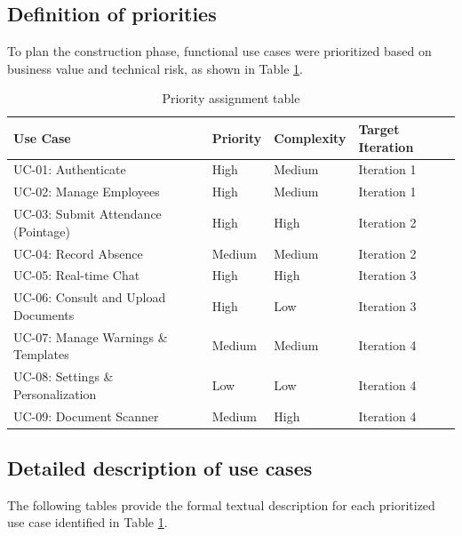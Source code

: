 \subsection{Definition of priorities}
To plan the construction phase, functional use cases were prioritized based on business value and technical risk, as shown in Table \ref{tab:priorities}.
\vspace{0.5cm}
\begin{table}[H]
\centering
\caption{Priority assignment table}
\label{tab:priorities}
\begin{tabular}{|l|l|l|l|}
\hline
\textbf{Use Case} & \textbf{Priority} & \textbf{Complexity} & \textbf{Target Iteration} \\
\hline
UC-01: Authenticate & High & Medium & Iteration 1 \\
\hline
UC-02: Manage Employees & High & Medium & Iteration 1 \\
\hline
UC-03: Submit Attendance (Pointage) & High & High & Iteration 2 \\
\hline
UC-04: Record Absence & Medium & Medium & Iteration 2 \\
\hline
UC-05: Real-time Chat & High & High & Iteration 3 \\
\hline
UC-06: Consult and Upload Documents & High & Low & Iteration 3 \\
\hline
UC-07: Manage Warnings \& Templates & Medium & Medium & Iteration 4 \\
\hline
UC-08: Settings \& Personalization & Low & Low & Iteration 4 \\
\hline
UC-09: Document Scanner & Medium & High & Iteration 4 \\
\hline
\end{tabular}
\end{table}

\subsection{Detailed description of use cases}
The following tables provide the formal textual description for each prioritized use case identified in Table \ref{tab:priorities}.

